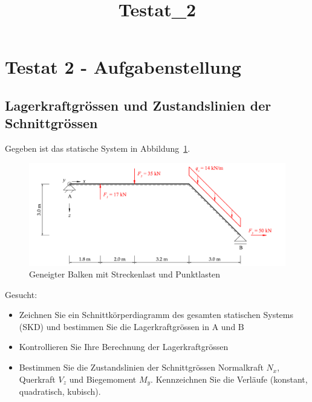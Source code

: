 \documentclass[
  12pt,
  letterpaper,
  DIV=11,
  egregdoesnotlikesansseriftitles]{scrartcl}
\title{Testat\_2}
\author{}
\date{}
\providecommand{\tightlist}{%
  \setlength{\itemsep}{0pt}\setlength{\parskip}{0pt}}\usepackage{longtable,booktabs,array}
\renewcommand{\maketitle}{}
\begin{document}
\maketitle
\ifdefined\Shaded\renewenvironment{Shaded}{\begin{tcolorbox}[boxrule=0pt, interior hidden, breakable, enhanced, borderline west={3pt}{0pt}{shadecolor}, sharp corners, frame hidden]}{\end{tcolorbox}}\fi

\hypertarget{testat-2---aufgabenstellung}{%
\section{Testat 2 -
Aufgabenstellung}\label{testat-2---aufgabenstellung}}

\hypertarget{lagerkraftgruxf6ssen-und-zustandslinien-der-schnittgruxf6ssen}{%
\subsection{Lagerkraftgrössen und Zustandslinien der
Schnittgrössen}\label{lagerkraftgruxf6ssen-und-zustandslinien-der-schnittgruxf6ssen}}

Gegeben ist das statische System in Abbildung~\ref{fig-system}.

\begin{figure}[H]

{\centering \includegraphics{BSI_HS23_Testat_02_files/mediabag/../images/Testat_02_HS23.pdf}

}

\caption{\label{fig-system}Geneigter Balken mit Streckenlast und
Punktlasten}

\end{figure}

Gesucht:

\begin{itemize}
\tightlist
\item
  Zeichnen Sie ein Schnittkörperdiagramm des gesamten statischen Systems
  (SKD) und bestimmen Sie die Lagerkraftgrössen in \(\text{A}\) und
  \(\text{B}\)
\item
  Kontrollieren Sie Ihre Berechnung der Lagerkraftgrössen
\item
  Bestimmen Sie die Zustandslinien der Schnittgrössen Normalkraft
  \(N_x\), Querkraft \(V_z\) und Biegemoment \(M_y\). Kennzeichnen Sie
  die Verläufe (konstant, quadratisch, kubisch).
\end{itemize}
\end{document}
